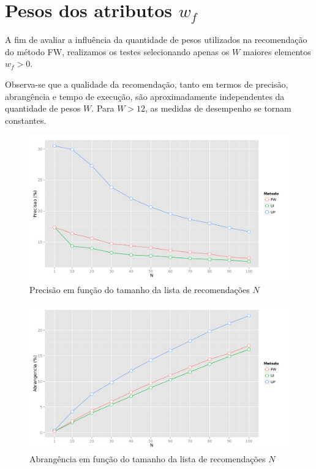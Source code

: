 {\section{Pesos dos atributos $w_f$} %
\label{sec:pesos_dos_atributos_}

A fim de avaliar a influência da quantidade de pesos utilizados na recomendação do método FW, realizamos os testes selecionando apenas os $W$ maiores elementos $w_f>0$.

Observa-se que a qualidade da recomendação, tanto em termos de precisão, abrangência e tempo de execução, são aproximadamente independentes da quantidade de pesos $W$. Para $W>12$, as medidas de desempenho se tornam constantes.



\begin{figure}[hp]
    \begin{center}
    \includegraphics[width=1\textwidth]{img/precision_N}
    \end{center}
    \caption{Precisão em função do tamanho da lista de recomendações $N$}
    \label{fig:precision_N}
\end{figure}


\begin{figure}[hp]
    \begin{center}
    \includegraphics[width=1\textwidth]{img/recall_N}
    \end{center}
    \caption{Abrangência em função do tamanho da lista de recomendações $N$}
    \label{fig:recall_N}
\end{figure}

}
